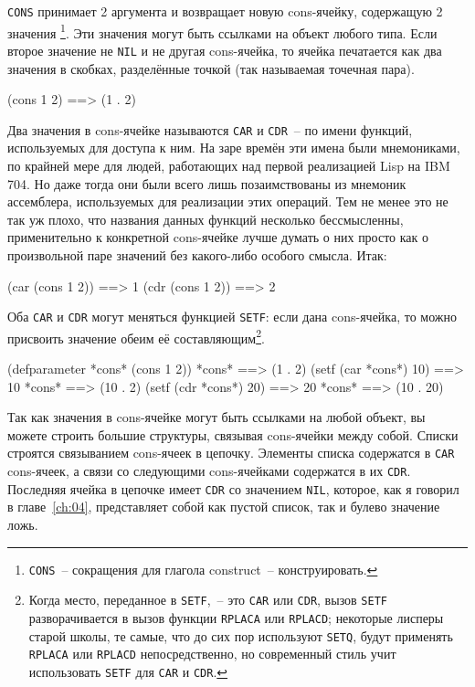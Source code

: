 \lstinline{CONS} принимает 2 аргумента и возвращает новую cons-ячейку, содержащую 2 значения
\footnote{\lstinline{CONS}~-- сокращения для глагола construct~-- конструировать.}. Эти значения
могут быть ссылками на объект любого типа. Если второе значение не \lstinline{NIL} и не другая
cons-ячейка, то ячейка печатается как два значения в скобках, разделённые точкой (так
называемая точечная пара).

\begin{myverb}
(cons 1 2) ==> (1 . 2)
\end{myverb}

Два значения в cons-ячейке называются \lstinline{CAR} и \lstinline{CDR}~-- по имени функций,
используемых для доступа к ним. На заре времён эти имена были мнемониками, по крайней мере
для людей, работающих над первой реализацией Lisp на IBM 704. Но даже тогда они были всего
лишь позаимствованы из мнемоник ассемблера, используемых для реализации этих операций. Тем
не менее это не так уж плохо, что названия данных функций несколько бессмысленны,
применительно к конкретной cons-ячейке лучше думать о них просто как о произвольной паре
значений без какого-либо особого смысла. Итак:

\begin{myverb}
(car (cons 1 2)) ==> 1
(cdr (cons 1 2)) ==> 2
\end{myverb}

Оба \lstinline{CAR} и \lstinline{CDR} могут меняться функцией \lstinline{SETF}: если дана cons-ячейка, то
можно присвоить значение обеим её составляющим\footnote{Когда место, переданное в
  \lstinline{SETF},~-- это \lstinline{CAR} или \lstinline{CDR}, вызов \lstinline{SETF} разворачивается в вызов
  функции \lstinline{RPLACA} или \lstinline{RPLACD}; некоторые лисперы старой школы, те самые, что
  до сих пор используют \lstinline{SETQ}, будут применять \lstinline{RPLACA} или \lstinline{RPLACD}
  непосредственно, но современный стиль учит использовать \lstinline{SETF} для \lstinline{CAR} и
  \lstinline{CDR}.}.

\begin{myverb}
(defparameter *cons* (cons 1 2))
*cons*                 ==> (1 . 2)
(setf (car *cons*) 10) ==> 10
*cons*                 ==> (10 . 2)
(setf (cdr *cons*) 20) ==> 20
*cons*                 ==> (10 . 20)
\end{myverb}

Так как значения в cons-ячейке могут быть ссылками на любой объект, вы можете строить большие
структуры, связывая cons-ячейки между собой. Списки строятся связыванием cons-ячеек в
цепочку. Элементы списка содержатся в \lstinline{CAR} cons-ячеек, а связи со следующими
cons-ячейками содержатся в их \lstinline{CDR}. Последняя ячейка в цепочке имеет \lstinline{CDR} со
значением \lstinline{NIL}, которое, как я говорил в главе~\ref{ch:04}, представляет собой как
пустой список, так и булево значение ложь.

